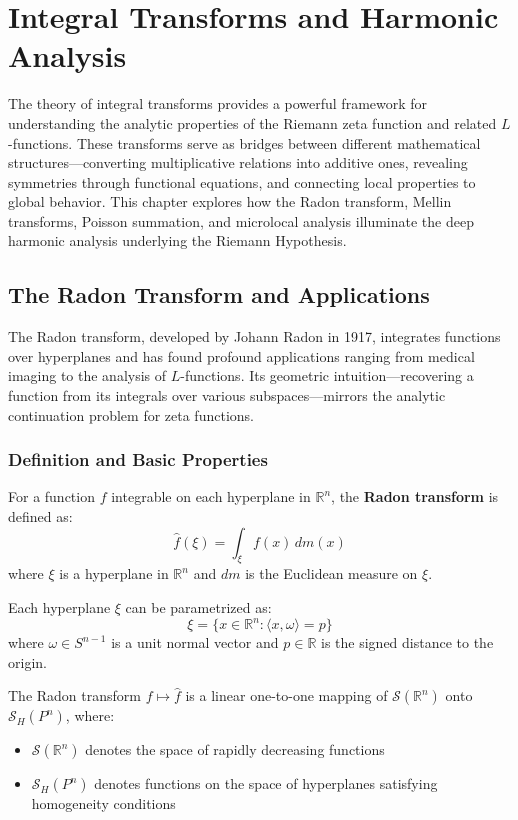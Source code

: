 \chapter{Integral Transforms and Harmonic Analysis}
\label{ch:integral-transforms}

The theory of integral transforms provides a powerful framework for understanding the analytic properties of the Riemann zeta function and related $L$-functions. These transforms serve as bridges between different mathematical structures—converting multiplicative relations into additive ones, revealing symmetries through functional equations, and connecting local properties to global behavior. This chapter explores how the Radon transform, Mellin transforms, Poisson summation, and microlocal analysis illuminate the deep harmonic analysis underlying the Riemann Hypothesis.

\section{The Radon Transform and Applications}
\label{sec:radon-transform}

The Radon transform, developed by Johann Radon in 1917, integrates functions over hyperplanes and has found profound applications ranging from medical imaging to the analysis of $L$-functions. Its geometric intuition—recovering a function from its integrals over various subspaces—mirrors the analytic continuation problem for zeta functions.

\subsection{Definition and Basic Properties}

\begin{definition}
For a function $f$ integrable on each hyperplane in $\mathbb{R}^n$, the \textbf{Radon transform} is defined as:
$$\hat{f}(\xi) = \int_{\xi} f(x) \, dm(x)$$
where $\xi$ is a hyperplane in $\mathbb{R}^n$ and $dm$ is the Euclidean measure on $\xi$.
\end{definition}

Each hyperplane $\xi$ can be parametrized as:
$$\xi = \{x \in \mathbb{R}^n : \langle x, \omega \rangle = p\}$$
where $\omega \in S^{n-1}$ is a unit normal vector and $p \in \mathbb{R}$ is the signed distance to the origin.

\begin{theorem}
The Radon transform $f \mapsto \hat{f}$ is a linear one-to-one mapping of $\mathcal{S}(\mathbb{R}^n)$ onto $\mathcal{S}_H(P^n)$, where:
\begin{itemize}
\item $\mathcal{S}(\mathbb{R}^n)$ denotes the space of rapidly decreasing functions
\item $\mathcal{S}_H(P^n)$ denotes functions on the space of hyperplanes satisfying homogeneity conditions
\end{itemize}
\end{theorem}

